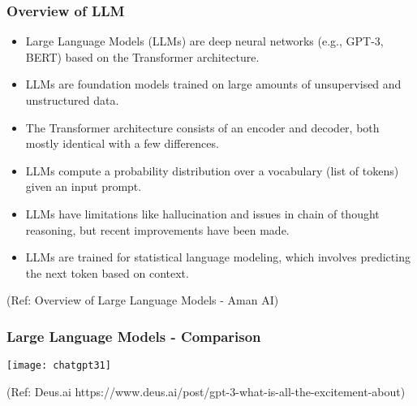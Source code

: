 \begin{frame}[fragile]\frametitle{Overview of LLM}


\begin{itemize}
\item Large Language Models (LLMs) are deep neural networks (e.g., GPT-3, BERT) based on the Transformer architecture.
\item LLMs are foundation models trained on large amounts of unsupervised and unstructured data.
\item The Transformer architecture consists of an encoder and decoder, both mostly identical with a few differences.
\item LLMs compute a probability distribution over a vocabulary (list of tokens) given an input prompt.
\item LLMs have limitations like hallucination and issues in chain of thought reasoning, but recent improvements have been made.
\item LLMs are trained for statistical language modeling, which involves predicting the next token based on context.
\end{itemize}

				
{\tiny (Ref: Overview of Large Language Models - Aman AI)}

\end{frame}


\begin{frame}[fragile]\frametitle{Large Language Models - Comparison}

\begin{center}
\texttt{[image: chatgpt31]}
\end{center}				
{\tiny (Ref: Deus.ai https://www.deus.ai/post/gpt-3-what-is-all-the-excitement-about)}

\end{frame}




